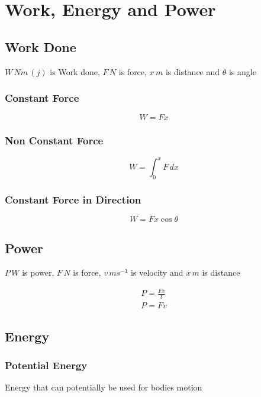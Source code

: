 \documentclass{article}
\begin{document}
\section{Work, Energy and Power}
\subsection{Work Done}
$W\,\si{Nm}\,\left (\si{j} \right )$ is Work done, $F\,\si{N}$ is force, $x\,\si{m}$ is distance and $\theta$ is angle
\subsubsection{Constant Force}
\begin{equation}
	W = Fx
\end{equation}

\subsubsection{Non Constant Force}

\begin{equation}
	W = \int^{x}_{0} F \,dx
\end{equation}

\subsubsection{Constant Force in Direction}

\begin{equation}
	W = F x \cos \theta
\end{equation}

\subsection{Power}
$P\,\si{W}$ is power, $F\,\si{N}$ is force, $v\,\si{ms^{-1}}$ is velocity and $x\,\si{m}$ is distance

\begin{gather}
	P = \frac{Fx}{t} \\
	P = Fv
\end{gather}

\subsection{Energy}

\subsubsection{Potential Energy}
Energy that can potentially be used for
bodies motion
\end{document}
